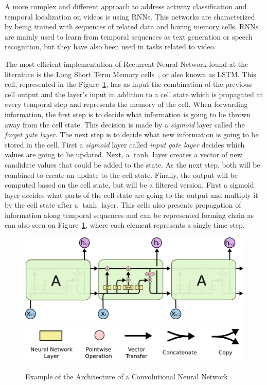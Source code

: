 A more complex and different approach to address activity classification and temporal localization on videos is using RNNs. This networks are characterized by being trained with sequences of related data and having memory cells. RNNs are mainly used to learn from temporal sequences as text generation or speech recognition, but they have also been used in tasks related to video.

The most efficient implementation of Recurrent Neural Network found at the literature is the Long Short Term Memory cells~\cite{hochreiter1997long}, or also known as LSTM. This cell, represented in the Figure~\ref{fig:lstm_chain}, has as input the combination of the previous cell output and the layer's input in addition to a cell state which is propagated at every temporal step and represents the memory of the cell.
When forwarding information, the first step is to decide what information is going to be thrown away from the cell state. This decision is made by a \textit{sigmoid} layer called the \textit{forget gate layer}.
The next step is to decide what new information is going to be stored in the cell. First a \textit{sigmoid} layer called \textit{input gate layer} decides which values are going to be updated. Next, a $\tanh$ layer creates a vector of new candidate values that could be added to the state. As the next step, both will be combined to create an update to the cell state.
Finally, the output will be computed based on the cell state, but will be a filtered version. First a sigmoid layer decides what parts of the cell state are going to the output and multiply it by the cell state after a $\tanh$ layer.
This cells also presents propagation of information along temporal sequences and can be represented forming chain as can also seen on Figure~\ref{fig:lstm_chain}, where each element represents a single time step.

\begin{figure}[ht]
\begin{center}
\includegraphics[width=0.8\linewidth]{img/stateofart/lstm_chain}
\includegraphics[width=0.5\linewidth]{img/stateofart/lstm_legend}
\end{center}
\caption{Example of the Architecture of a Convolutional Neural Network}
\label{fig:lstm_chain}
\end{figure}

